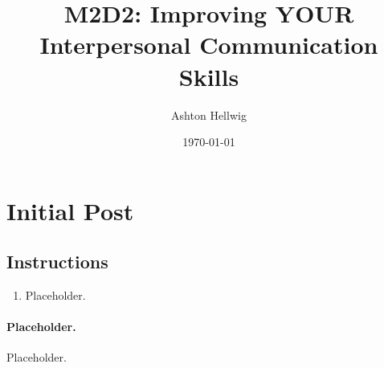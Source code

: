 \documentclass[stu,12pt]{apa7}
\title{%
    M2D2: Improving YOUR Interpersonal Communication Skills
  }
\author{Ashton Hellwig}
\date{\today}
\begin{document}
  \maketitle

  \section{Initial Post}
    \subsection*{Instructions}
      \begin{enumerate}
        \item Placeholder.
      \end{enumerate}

    \newpage
    \paragraph{Placeholder.}
      Placeholder.



\end{document}
